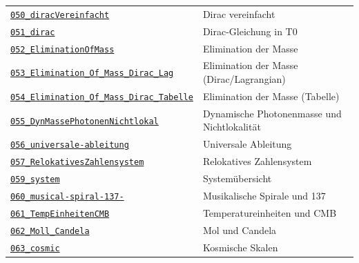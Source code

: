 {\begin{longtable}{@{}>{\raggedright\arraybackslash}p{} >{\raggedright\arraybackslash}p{}@{}}
\href{https://github.com/jpascher/T0-Time-Mass-Duality/blob/main/2/pdf/050_diracVereinfacht_De.pdf}{\texttt{050\_diracVereinfacht}} & Dirac vereinfacht \\
\href{https://github.com/jpascher/T0-Time-Mass-Duality/blob/main/2/pdf/051_dirac_De.pdf}{\texttt{051\_dirac}} & Dirac-Gleichung in T0 \\
\href{https://github.com/jpascher/T0-Time-Mass-Duality/blob/main/2/pdf/052_EliminationOfMass_De.pdf}{\texttt{052\_EliminationOfMass}} & Elimination der Masse \\
\href{https://github.com/jpascher/T0-Time-Mass-Duality/blob/main/2/pdf/053_Elimination_Of_Mass_Dirac_Lag_De.pdf}{\texttt{053\_Elimination\_Of\_Mass\_Dirac\_Lag}} & Elimination der Masse (Dirac/Lagrangian) \\
\href{https://github.com/jpascher/T0-Time-Mass-Duality/blob/main/2/pdf/054_Elimination_Of_Mass_Dirac_Tabelle_De.pdf}{\texttt{054\_Elimination\_Of\_Mass\_Dirac\_Tabelle}} & Elimination der Masse (Tabelle) \\
\href{https://github.com/jpascher/T0-Time-Mass-Duality/blob/main/2/pdf/055_DynMassePhotonenNichtlokal_De.pdf}{\texttt{055\_DynMassePhotonenNichtlokal}} & Dynamische Photonenmasse und Nichtlokalität \\
\href{https://github.com/jpascher/T0-Time-Mass-Duality/blob/main/2/pdf/056_universale-ableitung_De.pdf}{\texttt{056\_universale-ableitung}} & Universale Ableitung \\
\href{https://github.com/jpascher/T0-Time-Mass-Duality/blob/main/2/pdf/057_RelokativesZahlensystem_De.pdf}{\texttt{057\_RelokativesZahlensystem}} & Relokatives Zahlensystem \\
\href{https://github.com/jpascher/T0-Time-Mass-Duality/blob/main/2/pdf/059_system_De.pdf}{\texttt{059\_system}} & Systemübersicht \\
\href{https://github.com/jpascher/T0-Time-Mass-Duality/blob/main/2/pdf/060_musical-spiral-137-_De.pdf}{\texttt{060\_musical-spiral-137-}} & Musikalische Spirale und 137 \\
\href{https://github.com/jpascher/T0-Time-Mass-Duality/blob/main/2/pdf/061_TempEinheitenCMB_De.pdf}{\texttt{061\_TempEinheitenCMB}} & Temperatureinheiten und CMB \\
\href{https://github.com/jpascher/T0-Time-Mass-Duality/blob/main/2/pdf/062_Moll_Candela_De.pdf}{\texttt{062\_Moll\_Candela}} & Mol und Candela \\
\href{https://github.com/jpascher/T0-Time-Mass-Duality/blob/main/2/pdf/063_cosmic_De.pdf}{\texttt{063\_cosmic}} & Kosmische Skalen \\

\end{longtable}}
